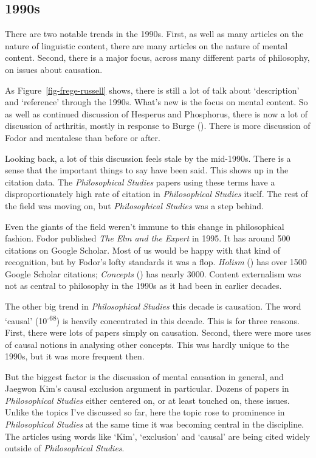 \documentclass[
  11pt,
  letterpaper,
  DIV=11,
  numbers=noendperiod,
  twoside]{scrartcl}
\begin{document}
\subsection{1990s}\label{sec-1990s-articles}

There are two notable trends in the 1990s. First, as well as many
articles on the nature of linguistic content, there are many articles on
the nature of mental content. Second, there is a major focus, across
many different parts of philosophy, on issues about causation.

As Figure~\ref{fig-frege-russell} shows, there is still a lot of talk
about `description' and `reference' through the 1990s. What's new is the
focus on mental content. So as well as continued discussion of Hesperus
and Phosphorus, there is now a lot of discussion of arthritis, mostly in
response to Burge (). There is
more discussion of Fodor and mentalese than before or after.

Looking back, a lot of this discussion feels stale by the mid-1990s.
There is a sense that the important things to say have been said. This
shows up in the citation data. The \emph{Philosophical Studies} papers
using these terms have a disproportionately high rate of citation in
\emph{Philosophical Studies} itself. The rest of the field was moving
on, but \emph{Philosophical Studies} was a step behind.

Even the giants of the field weren't immune to this change in
philosophical fashion. Fodor published \emph{The Elm and the Expert} in
1995. It has around 500 citations on Google Scholar. Most of us would be
happy with that kind of recognition, but by Fodor's lofty standards it
was a flop. \emph{Holism} () has over 1500 Google Scholar citations; \emph{Concepts}
() has nearly 3000. Content
externalism was not as central to philosophy in the 1990s as it had been
in earlier decades.

The other big trend in \emph{Philosophical Studies} this decade is
causation. The word `causal' (10\textsuperscript{-68}) is heavily
concentrated in this decade. This is for three reasons. First, there
were lots of papers simply on causation. Second, there were more uses of
causal notions in analysing other concepts. This was hardly unique to
the 1990s, but it was more frequent then.

But the biggest factor is the discussion of mental causation in general,
and Jaegwon Kim's causal exclusion argument in particular. Dozens of
papers in \emph{Philosophical Studies} either centered on, or at least
touched on, these issues. Unlike the topics I've discussed so far, here
the topic rose to prominence in \emph{Philosophical Studies} at the same
time it was becoming central in the discipline. The articles using words
like `Kim', `exclusion' and `causal' are being cited widely outside of
\emph{Philosophical Studies}.
\end{document}
